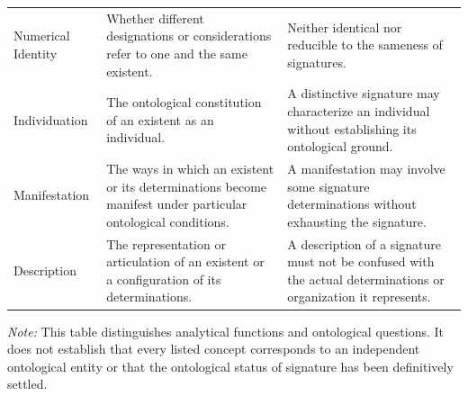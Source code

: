 \begin{table}[htbp]
\begin{tabular}{p{} p{} p{}}
        Numerical Identity
        &
        Whether different designations or considerations refer to one and the same existent.
        &
        Neither identical nor reducible to the sameness of signatures.
        \\

        Individuation
        &
        The ontological constitution of an existent as an individual.
        &
        A distinctive signature may characterize an individual without establishing its ontological ground.
        \\

        Manifestation
        &
        The ways in which an existent or its determinations become manifest under particular ontological conditions.
        &
        A manifestation may involve some signature determinations without exhausting the signature.
        \\

        Description
        &
        The representation or articulation of an existent or a configuration of its determinations.
        &
        A description of a signature must not be confused with the actual determinations or organization it represents.
        \\

        \hline
    \end{tabular}

    \vspace{0.5em}

    \begin{minipage}{0.92\textwidth}
        \footnotesize
        \textit{Note:} This table distinguishes analytical functions
        and ontological questions. It does not establish that every
        listed concept corresponds to an independent ontological
        entity or that the ontological status of signature has been
        definitively settled.
    \end{minipage}
\end{table}

